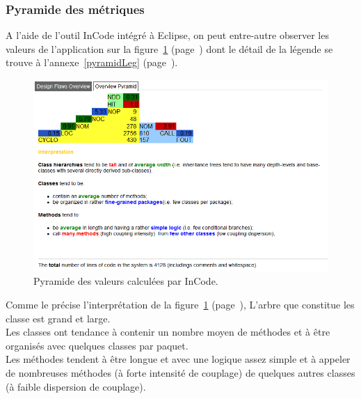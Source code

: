 \documentclass[12pt,a4paper,final]{article}
\newcommand{\annexe}[1]{annexe~\ref{#1} (page~\pageref{#1})}
\newcommand{\labelfigure}[1]{figure~\ref{#1} (page~\pageref{#1})}
\begin{document}
\subsubsection{Pyramide des métriques}
A l'aide de l'outil InCode intégré à Eclipse, on peut entre-autre observer les valeurs de l'application sur la \labelfigure{pyramid} dont le détail de la légende se trouve à l'\annexe{pyramidLeg}.
\begin{figure}[!h]
	\centering
	\includegraphics[width=\textwidth]{InCodePyramid.png}
	\caption{\label{pyramid}Pyramide des valeurs calculées par InCode.}
\end{figure}
Comme le précise l'interprétation de la \labelfigure{pyramid}, L'arbre que constitue les classe est grand et large.\\
Les classes ont tendance à contenir un nombre moyen de méthodes et à être organisés avec quelques classes par paquet.\\
Les méthodes tendent à être longue et avec une logique assez simple et à appeler de nombreuses méthodes (à forte intensité de couplage) de quelques autres classes (à faible dispersion de couplage).


\clearpage
\end{document}
